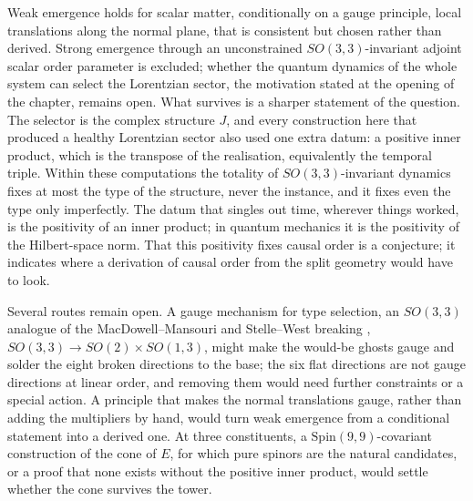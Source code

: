 Weak emergence holds for scalar matter, conditionally on a gauge principle, local translations along the normal plane, that is consistent but chosen rather than derived.
Strong emergence through an unconstrained $SO(3,3)$-invariant adjoint scalar order parameter is excluded; whether the quantum dynamics of the
whole system can select the Lorentzian sector, the motivation stated at the opening of the chapter, remains open. What survives is a sharper statement of the question. The selector is the complex structure $J$, and every
construction here that produced a healthy Lorentzian sector also used one extra datum: a positive inner product, which is the transpose of the realisation, equivalently
the temporal triple. Within these computations the totality of $SO(3,3)$-invariant dynamics fixes at most the type of the structure, never the instance, and it fixes even
the type only imperfectly. The datum that singles out time, wherever things worked, is the positivity of an inner product; in quantum mechanics it is the positivity of
the Hilbert-space norm. That this positivity fixes causal order is a conjecture; it indicates where a derivation of causal order from the split
geometry would have to look.

Several routes remain open. A gauge mechanism for type selection, an $SO(3,3)$ analogue of the MacDowell--Mansouri and Stelle--West breaking
\cite{MacDowellMansouri77,StelleWest80}, $SO(3,3)\to SO(2)\times SO(1,3)$, might make the would-be ghosts gauge and solder the eight broken directions to the base; the six flat directions are not gauge directions at
linear order, and removing them would need further constraints or a special action. A principle that makes the normal translations gauge, rather than adding the multipliers by hand, would turn weak emergence from a conditional statement into a
derived one. At three constituents, a $\mathrm{Spin}(9,9)$-covariant construction of the cone of $E$, for which pure spinors are the natural candidates, or a proof that
none exists without the positive inner product, would settle whether the cone survives the tower.

